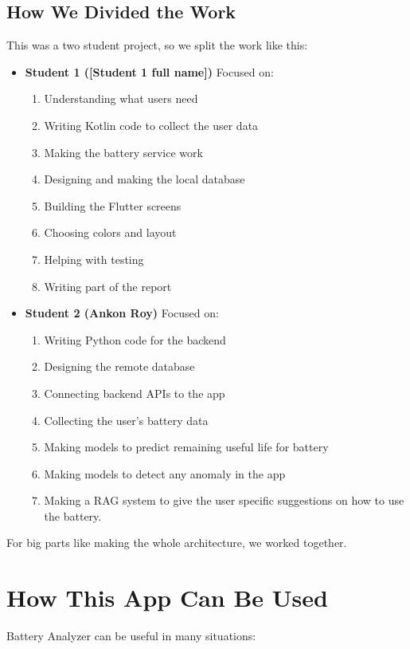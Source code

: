 \documentclass[12pt,a4paper]{report}
\begin{document}
\subsection{How We Divided the Work}
This was a two student project, so we split the work like this:

\begin{itemize}
    \item \textbf{Student 1 ([Student 1 full name])} Focused on:
    \begin{enumerate}
        \item Understanding what users need
        \item Writing Kotlin code to collect the user data
        \item Making the battery service work
        \item Designing and making the local database
        \item Building the Flutter screens
        \item Choosing colors and layout
        \item Helping with testing
        \item Writing part of the report
    \end{enumerate}
    
    \item \textbf{Student 2 (Ankon Roy)} Focused on:
    \begin{enumerate}
        \item Writing Python code for the backend
        \item Designing the remote database
        \item Connecting backend APIs to the app
        \item Collecting the user's battery data
        \item Making models to predict remaining useful life for battery
        \item Making models to detect any anomaly in the app
        \item Making a RAG system to give the user specific suggestions on how to use the battery.
    \end{enumerate}
\end{itemize}

For big parts like making the whole architecture, we worked together.

\section{How This App Can Be Used}
Battery Analyzer can be useful in many situations:
\end{document}
